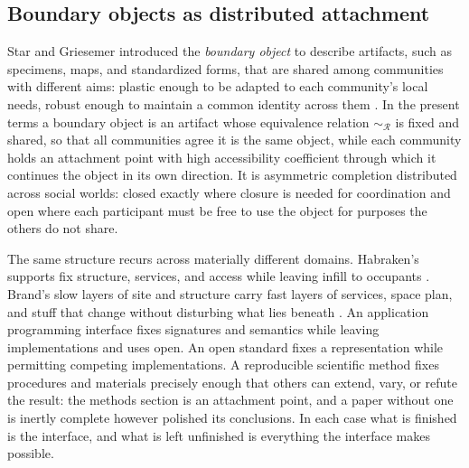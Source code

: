 \subsection{Boundary objects as distributed attachment}

Star and Griesemer introduced the \emph{boundary object} to describe artifacts, such as specimens, maps, and standardized forms, that are shared among communities with different aims: plastic enough to be adapted to each community's local needs, robust enough to maintain a common identity across them \cite{stargriesemer1989}. In the present terms a boundary object is an artifact whose equivalence relation $\sim_{\mathcal{R}}$ is fixed and shared, so that all communities agree it is the same object, while each community holds an attachment point with high accessibility coefficient through which it continues the object in its own direction. It is asymmetric completion distributed across social worlds: closed exactly where closure is needed for coordination and open where each participant must be free to use the object for purposes the others do not share.

The same structure recurs across materially different domains. Habraken's supports fix structure, services, and access while leaving infill to occupants \cite{habraken1972}. Brand's slow layers of site and structure carry fast layers of services, space plan, and stuff that change without disturbing what lies beneath \cite{brand1994}. An application programming interface fixes signatures and semantics while leaving implementations and uses open. An open standard fixes a representation while permitting competing implementations. A reproducible scientific method fixes procedures and materials precisely enough that others can extend, vary, or refute the result: the methods section is an attachment point, and a paper without one is inertly complete however polished its conclusions. In each case what is finished is the interface, and what is left unfinished is everything the interface makes possible.
